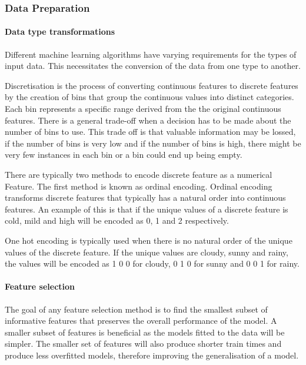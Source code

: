 \documentclass[10pt, conference]{IEEEtran}
\begin{document}
\subsubsection{Data Preparation}

\paragraph{Data type transformations}

Different machine learning algorithms have varying requirements for the types of input data. This necessitates
the conversion of the data from one type to another.

Discretisation is the process of converting continuous features to discrete features by the creation of bins
that group the continuous values into distinct categories. Each bin represents a specific range derived from the
the original continuous features. There is a general trade-off when a decision has to be made about the number of
bins to use. This trade off is that valuable information may be lossed, if the number of bins is very low and
if the number of bins is high, there might be very few instances in each bin or a bin could end up being empty.

There are typically two methods to encode discrete feature as a numerical Feature. The first method is known as
ordinal encoding. Ordinal encoding transforms discrete features that typically has a natural order into continuous
features. An example of this is that if the unique values of a discrete feature is cold, mild and high will be
encoded as 0, 1 and 2 respectively.

One hot encoding is typically used when there is no natural order of the unique values of the discrete feature.
If the unique values are cloudy, sunny and rainy, the values will be encoded as 1 0 0 for cloudy, 0 1 0 for
sunny and 0 0 1 for rainy.


\paragraph{Feature selection}

The goal of any feature selection method is to find the smallest subset of informative features that
preserves the overall performance of the model. A smaller subset of features is beneficial as the
models fitted to the data will be simpler. The smaller set of features will also produce shorter
train times and produce less overfitted models, therefore improving the generalisation of a model.
\end{document}
